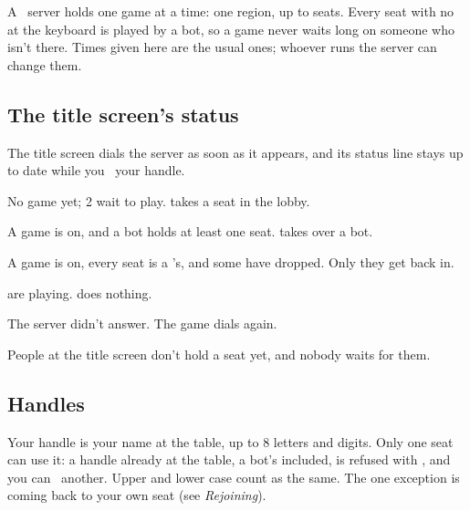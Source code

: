 A \game\ server holds one game at a time: one region, up to  seats. Every seat with no
 at the keyboard is played by a bot, so a game never waits long on someone who isn't there.
Times given here are the usual ones; whoever runs the server can change them.

\subsection{The title screen's status}
The title screen dials the server as soon as it appears, and its status line stays up to date while you
\typeword\ your handle.

\begin{description}[leftmargin=0pt,labelsep=0.5em]
  \item[\code{\Status{lobby}{2}}] No game yet; 2  wait to play. \key{\KeyReturn} takes a seat in the lobby.
  \item[\code{\Status{jackin}}] A game is on, and a bot holds at least one seat. \key{\KeyReturn} takes over a bot.
  \item[\code{\Status{away}}] A game is on, every seat is a 's, and some have dropped. Only they get back in.
  \item[\code{\Status{full}}]   are playing. \key{\KeyReturn} does nothing.
  \item[\code{NO CARRIER}] The server didn't answer. The game dials again.
\end{description}
People at the title screen don't hold a seat yet, and nobody waits for them.

\subsection{Handles}
Your handle is your name at the table, up to 8 letters and digits. Only one seat can use it: a handle
already at the table, a bot's included, is refused with , and you can \typeword\ another.
Upper and lower case count as the same. The one exception is coming back to your own seat (see
\emph{Rejoining}).

